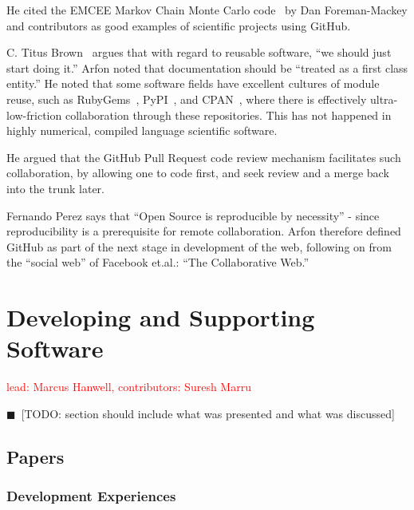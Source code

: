 \documentclass[11pt, oneside]{amsart}
\newcommand{\todo}[1]{{\color{blue}$\blacksquare$~\textsf{[TODO: #1]}}}
\newcommand{\note}[1]{ {\textcolor{red}    { #1 }}}
\begin{document}
He cited the EMCEE Markov
Chain Monte Carlo code~\cite{emcee-web} by Dan Foreman-Mackey and contributors
as good examples of scientific projects using GitHub.

C. Titus Brown~\cite{ged-web} argues that with
regard to reusable software, ``we should just start doing it.'' Arfon
noted that documentation should be ``treated as a first class
entity.''  He noted that some software fields have excellent cultures
of module reuse, such as
RubyGems~\cite{rubygems-web},
PyPI~\cite{pypi-web}, and
CPAN~\cite{cpan-web}, where there is effectively
ultra-low-friction collaboration through these repositories. This has
not happened in highly numerical, compiled language scientific
software.

He argued that the GitHub Pull Request code review mechanism facilitates
such collaboration, by allowing one to code first, and seek review and a
merge back into the trunk later.

Fernando Perez says that ``Open Source is reproducible by necessity''
- since reproducibility is a prerequisite for remote collaboration.
Arfon therefore defined GitHub as part of the next stage in
development of the web, following on from the ``social web'' of
Facebook et.al.: ``The Collaborative Web.''

\section{Developing and Supporting Software} \label{sec:devel}

\note{lead: Marcus Hanwell, contributors: Suresh Marru}

\todo{section should include what was presented and what was discussed}

\subsection{Papers}

\subsubsection*{Development Experiences}
\end{document}
